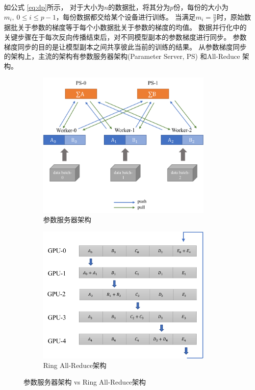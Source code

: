 如公式 \ref{eq:dp}所示，
对于大小为$n$的数据批，将其分为$p$份，每份的大小为$m_i,\ 0\le i\le p-1$，每份数据都交给某个设备进行训练。
当满足$m_i=\frac{n}{p}$时，原始数据批关于参数的梯度等于每个小数据批关于参数的梯度的均值。
数据并行化中的关键步骤在于每次反向传播结束后，对不同模型副本的参数梯度进行同步。
参数梯度同步的目的是让模型副本之间共享彼此当前的训练的结果。
从参数梯度同步的架构上，主流的架构有参数服务器架构(Parameter Server, PS)  和All-Reduce  架构。

\begin{figure}
	\centering
	\begin{subfigure}[b]{0.48\textwidth}
		\centering
		\includegraphics[width=0.95\textwidth]{figure/2-background/ps.pdf}
		\caption{参数服务器架构}
		\label{fig:ps}
	\end{subfigure}
	\begin{subfigure}[b]{0.45\textwidth}
		\centering
		\includegraphics[width=0.95\textwidth]{figure/2-background/ring.pdf}
		\caption{Ring All-Reduce架构}
		\label{fig:ring}
	\end{subfigure}
	\caption{参数服务器架构 vs Ring All-Reduce架构}
	\label{fig:ps-ring}
\end{figure}

